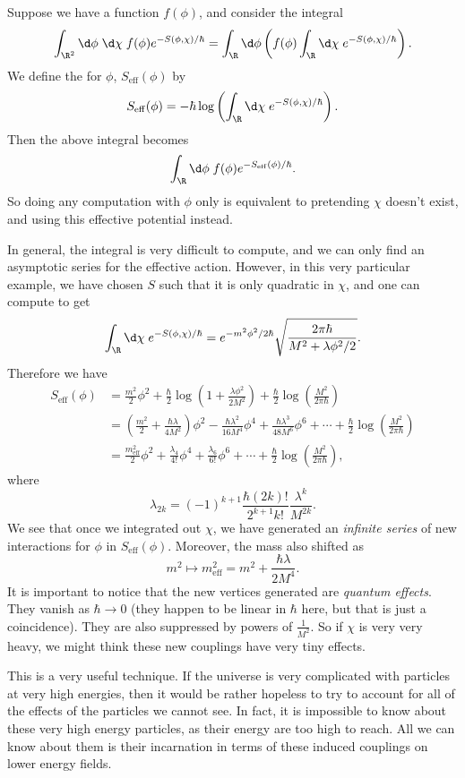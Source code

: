 \documentclass[a4paper]{article}
\begin{document}
Suppose we have a function $f(\phi)$, and consider the integral
\[
  \int_{\R^2} \d \phi\;\d \chi\; f(\phi) e^{-S(\phi, \chi)/\hbar} = \int_\R \d \phi \left(f(\phi) \int_\R \d \chi\;e^{-S(\phi, \chi)/\hbar}\right).
\]
We define the  for $\phi$, $S_{\mathrm{eff}}(\phi)$ by
\[
  S_{\mathrm{eff}}(\phi) = -\hbar \log \left(\int_\R \d \chi\; e^{-S(\phi, \chi)/\hbar}\right).
\]
Then the above integral becomes
\[
  \int_\R \d \phi\; f(\phi) e^{-S_{\mathrm{eff}}(\phi)/\hbar}.
\]
So doing any computation with $\phi$ only is equivalent to pretending $\chi$ doesn't exist, and using this effective potential instead.


In general, the integral is very difficult to compute, and we can only find an asymptotic series for the effective action. However, in this very particular example, we have chosen $S$ such that it is only quadratic in $\chi$, and one can compute to get
\[
  \int_\R \d \chi\; e^{-S(\phi, \chi)/\hbar} = e^{-m^2 \phi^2/2\hbar} \sqrt{\frac{2\pi \hbar}{M^2 + \lambda \phi^2/2}}.
\]
Therefore we have
\begin{align*}
  S_{\mathrm{eff}}(\phi) &= \frac{m^2}{2}\phi^2 + \frac{\hbar}{2} \log \left(1 + \frac{\lambda \phi^2}{2M^2}\right) + \frac{\hbar}{2} \log \left(\frac{M^2}{2\pi \hbar}\right)\\
  &= \left(\frac{m^2}{2} + \frac{\hbar \lambda}{4M^2}\right)\phi^2 - \frac{\hbar \lambda^2}{16 M^4} \phi^4 + \frac{\hbar \lambda^3}{48 M^6} \phi^6 + \cdots + \frac{\hbar}{2} \log \left(\frac{M^2}{2\pi \hbar}\right)\\
  &= \frac{m_{\mathrm{eff}}^2}{2} \phi^2 + \frac{\lambda_4}{4!} \phi^4 + \frac{\lambda_6}{6!} \phi^6 + \cdots + \frac{\hbar}{2} \log \left(\frac{M^2}{2\pi \hbar}\right),
\end{align*}
where
\[
  \lambda_{2k} = (-1)^{k + 1} \frac{\hbar (2k)!}{2^{k + 1}k!} \frac{\lambda^k}{M^{2k}}.
\]
We see that once we integrated out $\chi$, we have generated an \emph{infinite series} of new interactions for $\phi$ in $S_{\mathrm{eff}} (\phi)$. Moreover, the mass also shifted as
\[
  m^2 \mapsto m^2_{\mathrm{eff}} = m^2 + \frac{\hbar \lambda}{2M^4}.
\]
It is important to notice that the new vertices generated are \emph{quantum effects}. They vanish as $\hbar \to 0$ (they happen to be linear in $\hbar$ here, but that is just a coincidence). They are also suppressed by powers of $\frac{1}{M^2}$. So if $\chi$ is very very heavy, we might think these new couplings have very tiny effects.

This is a very useful technique. If the universe is very complicated with particles at very high energies, then it would be rather hopeless to try to account for all of the effects of the particles we cannot see. In fact, it is impossible to know about these very high energy particles, as their energy are too high to reach. All we can know about them is their incarnation in terms of these induced couplings on lower energy fields.
\end{document}
